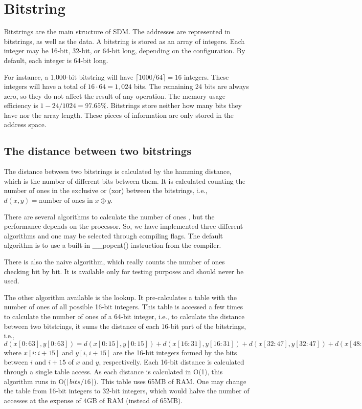 \section{Bitstring}

Bitstrings are the main structure of SDM. The addresses are represented in bitstrings, as well as the data. A bitstring is stored as an array of integers. Each integer may be 16-bit, 32-bit, or 64-bit long, depending on the configuration. By default, each integer is 64-bit long.

For instance, a 1,000-bit bitstring will have $\lceil 1000/64 \rceil = 16$ integers. These integers will have a total of $16 \cdot 64 = 1,024$ bits. The remaining 24 bits are always zero, so they do not affect the result of any operation. The memory usage efficiency is $1 - 24/1024 = 97.65\%$. Bitstrings store neither how many bits they have nor the array length. These pieces of information are only stored in the address space.


\subsection{The distance between two bitstrings}

The distance between two bitstrings is calculated by the hamming distance, which is the number of different bits between them. It is calculated counting the number of ones in the exclusive or (xor) between the bitstrings, i.e., $d(x, y) = \text{number of ones in } x \oplus y$.

There are several algorithms to calculate the number of ones \citep{warren2013hacker}, but the performance depends on the processor. So, we have implemented three different algorithms and one may be selected through compiling flags. The default algorithm is to use a built-in \_\_popcnt() instruction from the compiler.

There is also the naive algorithm, which really counts the number of ones checking bit by bit. It is available only for testing purposes and should never be used.

The other algorithm available is the lookup. It pre-calculates a table with the number of ones of all possible 16-bit integers. This table is accessed a few times to calculate the number of ones of a 64-bit integer, i.e., to calculate the distance between two bitstrings, it sums the distance of each 16-bit part of the bitstrings, i.e., $d(x[0:63], y[0:63]) = d(x[0:15], y[0:15]) + d(x[16:31], y[16:31]) + d(x[32:47], y[32:47]) + d(x[48:63], y[48:63])$ where $x[i:i+15]$ and $y[i, i+15]$ are the 16-bit integers formed by the bits between $i$ and $i+15$ of $x$ and $y$, respectivelly. Each 16-bit distance is calculated through a single table access. As each distance is calculated in O(1), this algorithm runs in O($\lceil bits/16 \rceil$). This table uses 65MB of RAM. One may change the table from 16-bit integers to 32-bit integers, which would halve the number of accesses at the expense of 4GB of RAM (instead of 65MB).


